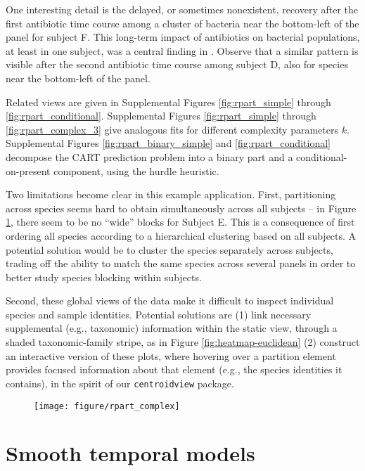 \documentclass[14pt]{extarticle}
\begin{document}
One interesting detail is the delayed, or sometimes nonexistent, recovery after
the first antibiotic time course among a cluster of bacteria near the bottom-left of
the panel for subject F. This long-term impact of antibiotics on bacterial
populations, at least in one subject, was a central finding in
\cite{dethlefsen2011incomplete}. Observe that a similar pattern is visible after
the second antibiotic time course among subject D, also for species near the
bottom-left of the panel.

Related views are given in Supplemental Figures \ref{fig:rpart_simple} through
\ref{fig:rpart_conditional}. Supplemental Figures \ref {fig:rpart_simple}
through \ref{fig:rpart_complex_3} give analogous fits for different complexity
parameters $k$. Supplemental Figures \ref{fig:rpart_binary_simple} and
\ref{fig:rpart_conditional} decompose the CART prediction problem into a binary
part and a conditional-on-present component, using the hurdle heuristic.

Two limitations become clear in this example application. First, partitioning
across species seems hard to obtain simultaneously across all subjects -- in
Figure \ref{fig:rpart_complex}, there seem to be no ``wide'' blocks for Subject
E. This is a consequence of first ordering all species according to a
hierarchical clustering based on all subjects. A potential solution would be to
cluster the species separately across subjects, trading off the ability to match
the same species across several panels in order to better study species blocking
within subjects.

Second, these global views of the data make it difficult to inspect individual
species and sample identities. Potential solutions are (1) link necessary
supplemental (e.g., taxonomic) information within the static view, through a
shaded taxonomic-family stripe, as in Figure \ref{fig:heatmap-euclidean} (2)
construct an interactive version of these plots, where hovering over a partition
element provides focused information about that element (e.g., the species
identities it contains), in the spirit of our \texttt{centroidview} package.

\begin{figure}
  \centering
  \texttt{[image: figure/rpart\_complex]}
  \caption{\label{fig:rpart_complex} }
\end{figure}

\section{Smooth temporal models}
\label{sec:smooth_temporal_models}
\end{document}
